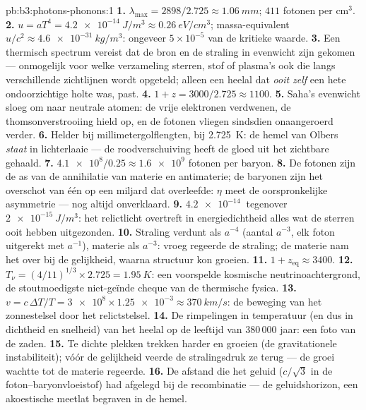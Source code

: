 \begin{solution}{pb:b3:photons-phonons:1}
\textbf{1.} $\lambda_{\max} = 2898/2.725 \approx \qty{1.06}{mm}$;
$411$ fotonen per cm$^3$.
\textbf{2.} $u = aT^4 = \qty{4.2e-14}{J/m^3} \approx
\qty{0.26}{eV/cm^3}$; massa-equivalent $u/c^2 \approx
\qty{4.6e-31}{kg/m^3}$: ongeveer $5\times10^{-5}$ van de kritieke waarde.
\textbf{3.} Een thermisch spectrum vereist dat de bron en de
straling in evenwicht zijn gekomen --- onmogelijk voor welke
verzameling sterren, stof of plasma's ook die langs
verschillende zichtlijnen wordt opgeteld; alleen een
heelal dat \emph{ooit zelf} een hete ondoorzichtige holte was, past.
\textbf{4.} $1 + z = 3000/2.725 \approx 1100$.
\textbf{5.} Saha's evenwicht sloeg om naar neutrale atomen: de vrije
elektronen verdwenen, de thomsonverstrooiing hield op, en de fotonen
vliegen sindsdien onaangeroerd verder.
\textbf{6.} Helder bij millimetergolflengten, bij
\qty{2.725}{K}: de hemel van Olbers \emph{staat} in lichterlaaie ---
de roodverschuiving heeft de gloed uit het zichtbare gehaald.
\textbf{7.} $\num{4.1e8}/0.25 \approx \num{1.6e9}$ fotonen per
baryon.
\textbf{8.} De fotonen zijn de as van de annihilatie van materie
en antimaterie; de baryonen zijn het overschot van één op een
miljard dat overleefde: $\eta$ meet de oorspronkelijke asymmetrie
--- nog altijd onverklaard.
\textbf{9.} $\qty{4.2e-14}{}$ tegenover $\qty{2e-15}{J/m^3}$: het
relictlicht overtreft in energiedichtheid alles wat de sterren
ooit hebben uitgezonden.
\textbf{10.} Straling verdunt als $a^{-4}$ (aantal $a^{-3}$,
elk foton uitgerekt met $a^{-1}$), materie als $a^{-3}$: vroeg
regeerde de straling; de materie nam het over bij de gelijkheid,
waarna structuur kon groeien.
\textbf{11.} $1 + z_{\text{eq}} \approx 3400$.
\textbf{12.} $T_\nu = (4/11)^{1/3} \times 2.725 =
\qty{1.95}{K}$: een voorspelde kosmische neutrinoachtergrond, de
stoutmoedigste niet-geïnde cheque van de thermische fysica.
\textbf{13.} $v = c\,\Delta T/T = \num{3e8} \times \num{1.25e-3}
\approx \qty{370}{km/s}$: de beweging van het zonnestelsel door
het relictstelsel.
\textbf{14.} De rimpelingen in temperatuur (en dus in dichtheid en
snelheid) van het heelal op de leeftijd van 380\,000 jaar: een
foto van de zaden.
\textbf{15.} Te dichte plekken trekken harder en groeien (de
gravitationele instabiliteit); vóór de gelijkheid veerde de
stralingsdruk ze terug --- de groei wachtte tot de materie regeerde.
\textbf{16.} De afstand die het geluid ($c/\sqrt3$ in de
foton--baryonvloeistof) had afgelegd bij de recombinatie --- de
geluidshorizon, een akoestische meetlat begraven in de hemel.

\end{solution}
